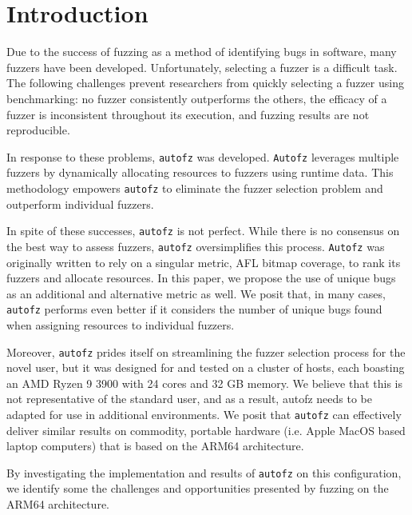 \section{Introduction}

Due to the success of fuzzing as a method of identifying bugs in software, many fuzzers have been 
developed. Unfortunately, selecting a fuzzer is a difficult task. The following challenges prevent 
researchers from quickly selecting a fuzzer using benchmarking: no fuzzer consistently outperforms 
the others, the efficacy of a fuzzer is inconsistent throughout its execution, and fuzzing results 
are not reproducible.

In response to these problems, \texttt{autofz} was developed. \texttt{Autofz} leverages multiple fuzzers by dynamically 
allocating resources to fuzzers using runtime data. This methodology empowers \texttt{autofz} to eliminate the 
fuzzer selection problem and outperform individual fuzzers.

In spite of these successes, \texttt{autofz} is not perfect. While there is no consensus on the best way to 
assess fuzzers, \texttt{autofz} oversimplifies this process. \texttt{Autofz} was originally written to rely on a 
singular metric, AFL bitmap coverage, to rank its fuzzers and allocate resources. In this paper, we
propose the use of unique bugs as an additional and alternative metric as well. We posit that, in 
many cases, \texttt{autofz} performs even better if it considers the number of unique bugs found when assigning 
resources to individual fuzzers.

Moreover, \texttt{autofz} prides itself on streamlining the fuzzer selection process for the novel user, but 
it was designed for and tested on a cluster of hosts, each boasting an AMD Ryzen 9 3900 with 24 cores 
and 32 GB memory. We believe that this is not representative of the standard user, and as a result, 
autofz needs to be adapted for use in additional environments. \cite{fu_autofz_2023} We posit that \texttt{autofz} can 
effectively deliver similar results on commodity, portable hardware (i.e. Apple MacOS based laptop 
computers) that is based on the ARM64 architecture. 

By investigating the implementation and results of \texttt{autofz} on this configuration, we identify some the 
challenges and opportunities presented by fuzzing on the ARM64 architecture.

